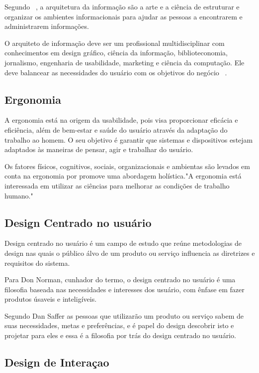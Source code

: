 Segundo ~, a arquitetura da informação são a arte e a ciência de estruturar e organizar os ambientes informacionais para ajudar as pessoas a encontrarem e administrarem informações.

O arquiteto de informação deve ser um profissional multidisciplinar com conhecimentos em design gráfico, ciência da informação, biblioteconomia, jornalismo, engenharia de usabilidade, marketing e ciência da computação. Ele deve balancear as necessidades do usuário com os objetivos do negócio ~\cite{rosenfeld1998}.

\subsection{Ergonomia}

A ergonomia está na origem da usabilidade, pois visa proporcionar eficácia e eficiência, além de bem-estar e saúde do usuário através da adaptação do trabalho ao homem. O seu objetivo é garantir que sistemas e dispositivos estejam adaptados às maneiras de pensar, agir e trabalhar do usuário. ~\cite{cybis2010}

	Os fatores físicos, cognitivos, sociais, organizacionais e ambientas são levados em conta na ergonomia por promove uma abordagem holística."A ergonomia está interessada em utilizar as ciências para melhorar as condições de trabalho humano."    

\subsection{Design Centrado no usuário}

	Design centrado no usuário é um campo de estudo que reúne metodologias de design nas quais o público álvo de um produto ou serviço influencia as diretrizes e requisitos do sistema. %
	
	Para Don Norman, cunhador do termo, o design centrado no usuário é uma filosofia baseada nas necessidades e interesses dos usuário, com ênfase em fazer produtos úsaveis e inteligíveis. %

	Segundo Dan Saffer as pessoas que utilizarão um produto ou serviço sabem de suas necessidades, metas e preferências, e é papel do design descobrir isto e projetar para eles e essa é a filosofia por trás do design centrado no usuário.%
	
\subsection{Design de Interaçao}

